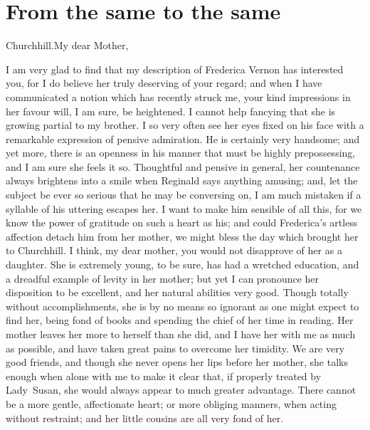 \chapter{From the same to the same}
  
  \begin{mail}{Churchhill.}{My dear Mother,}

I am very glad to find that my description of Frederica Vernon has interested you, for I do believe her truly deserving of your regard; and when I have communicated a notion which has recently struck me, your kind impressions in her favour will, I am sure, be heightened. I cannot help fancying that she is growing partial to my brother. I so very often see her eyes fixed on his face with a remarkable expression of pensive admiration. He is certainly very handsome; and yet more, there is an openness in his manner that must be highly prepossessing, and I am sure she feels it so. Thoughtful and pensive in general, her countenance always brightens into a smile when Reginald says anything amusing; and, let the subject be ever so serious that he may be conversing on, I am much mistaken if a syllable of his uttering escapes her. I want to make him sensible of all this, for we know the power of gratitude on such a heart as his; and could Frederica's artless affection detach him from her mother, we might bless the day which brought her to Churchhill. I think, my dear mother, you would not disapprove of her as a daughter. She is extremely young, to be sure, has had a wretched education, and a dreadful example of levity in her mother; but yet I can pronounce her disposition to be excellent, and her natural abilities very good. Though totally without accomplishments, she is by no means so ignorant as one might expect to find her, being fond of books and spending the chief of her time in reading. Her mother leaves her more to herself than she did, and I have her with me as much as possible, and have taken great pains to overcome her timidity. We are very good friends, and though she never opens her lips before her mother, she talks enough when alone with me to make it clear that, if properly treated by Lady~Susan, she would always appear to much greater advantage. There cannot be a more gentle, affectionate heart; or more obliging manners, when acting without restraint; and her little cousins are all very fond of her. 

\end{mail}